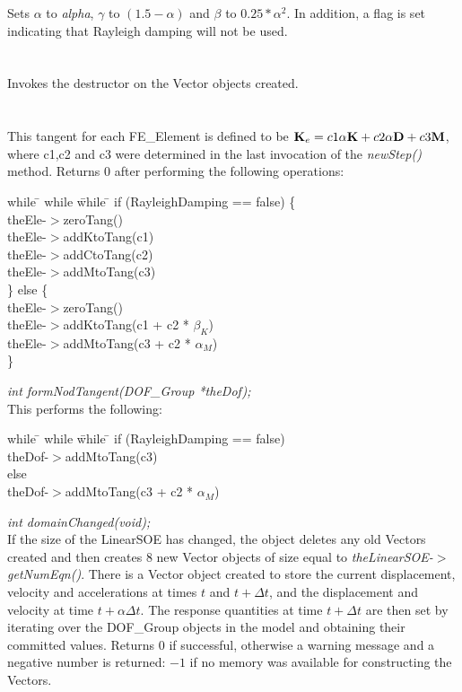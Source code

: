 Sets $\alpha$ to {\em alpha}, $\gamma$ to $(1.5 - \alpha)$ and $\beta$
to $0.25*\alpha^2$. In addition, a flag is set indicating that Rayleigh
damping will not be used. \\

 \\
\\ 
Invokes the destructor on the Vector objects created. \\

\\
 \\
This tangent for each FE\_Element is defined to be ${\bf K}_e = c1\alpha {\bf K}
+ c2\alpha {\bf D} + c3 {\bf M}$, where c1,c2 and c3 were determined in the last invocation
of the {\em newStep()} method. Returns $0$ after performing the
following operations:  
\begin{tabbing}
while \= \+ while \= while \= \kill
if (RayleighDamping == false) \{ \+ \\
theEle-$>$zeroTang() \\
theEle-$>$addKtoTang(c1) \\
theEle-$>$addCtoTang(c2) \\
theEle-$>$addMtoTang(c3)  \- \\
\} else \{ \+ \\
theEle-$>$zeroTang() \\
theEle-$>$addKtoTang(c1 + c2 * $\beta_K$) \\
theEle-$>$addMtoTang(c3 + c2 * $\alpha_M$)  \- \\ 
\}
\end{tabbing}

{\em int formNodTangent(DOF\_Group *theDof);} \\
This performs the following:
\begin{tabbing}
while \= \+ while \= while \= \kill
if (RayleighDamping == false)  \+ \\
theDof-$>$addMtoTang(c3)  \- \\
else \+ \\
theDof-$>$addMtoTang(c3 + c2 * $\alpha_M$)  \- \\ 
\end{tabbing}


{\em int domainChanged(void);}\\
If the size of the LinearSOE has changed, the object deletes any old Vectors
created and then creates $8$ new Vector objects of size equal to {\em
theLinearSOE-$>$getNumEqn()}. There is a Vector object created to store
the current displacement, velocity and accelerations at times $t$ and
$t + \Delta t$, and the displacement and velocity at time $t + \alpha
\Delta t$. The response quantities at time $t + \Delta t$ are
then set by iterating over the DOF\_Group objects in the model and
obtaining their committed values. 
Returns $0$ if successful, otherwise a warning message and a negative
number is returned: $-1$ if no memory was available for constructing
the Vectors. \\


